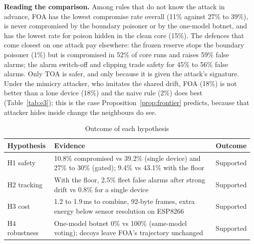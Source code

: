\textbf{Reading the comparison.} Among rules that do not know the attack in advance, FOA has the lowest
compromise rate overall (11\% against 27\% to 39\%), is never compromised by the boundary poisoner or by
the one-model botnet, and has the lowest rate for poison hidden in the clean core (15\%). The defences
that come closest on one attack pay elsewhere: the frozen reserve stops the boundary poisoner (1\%) but
is compromised in 52\% of core runs and raises 59\% false alarms; the alarm switch-off and clipping trade
safety for 45\% to 56\% false alarms. Only TOA is safer, and only because it is given the attack's
signature. Under the mimicry attacker, who imitates the shared drift, FOA (18\%) is not better than a lone
device (18\%) and the naive rule (2\%) does best (Table~\ref{tab:e3}); this is the case
Proposition~\ref{prop:frontier} predicts, because that attacker hides inside change the neighbours do see.

\begin{table}[t]
\caption{Outcome of each hypothesis}\label{tab:hyp}
\centering\footnotesize
\begin{tabular}{@{}p{1.25cm}p{4.7cm}p{1.45cm}@{}}
\toprule
Hypothesis & Evidence & Outcome \\
\midrule
H1 safety & 10.8\% compromised vs 39.2\% (single device) and 27\% to 30\% (gated); 9.4\% vs 43.1\% with the floor & Supported \\
H2 tracking & With the floor, 2.5\% fleet false alarms after strong drift vs 0.8\% for a single device & Supported \\
H3 cost & 1.2 to 1.9\,ms to combine, 92-byte frames, extra energy below sensor resolution on ESP8266 & Supported \\
H4 robustness & One-model botnet 0\% vs 100\% (same-model voting); decoys leave FOA's trajectory unchanged & Supported \\
\bottomrule
\end{tabular}
\end{table}
